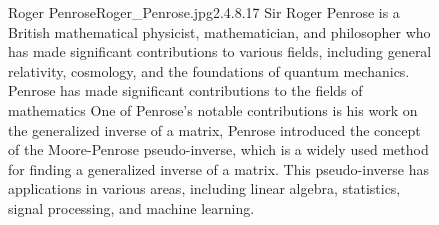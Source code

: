 \begin{figure}[b]
        \begin{enrichment}{Roger Penrose}{Roger_Penrose.jpg}{2.4}{.8}{.17}
        Sir Roger Penrose is a British mathematical physicist, mathematician, and philosopher 
        who has made significant contributions to various fields, including general relativity, 
        cosmology, and the foundations of quantum mechanics. \\
        Penrose has made significant contributions to the fields of mathematics
        One of Penrose's notable contributions is his work on the generalized inverse of a matrix, 
        Penrose introduced the concept of the Moore-Penrose pseudo-inverse, 
        which is a widely used method for finding a generalized inverse of a matrix. 
        This pseudo-inverse has applications in various areas, including linear algebra, 
        statistics, signal processing, and machine learning.
\end{enrichment}
\end{figure}
